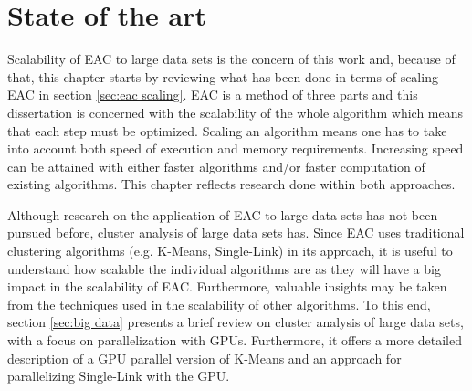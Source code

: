 
\chapter{State of the art}
\label{chapter:stateofart}




Scalability of EAC to large data sets is the concern of this work and, because of that, this chapter starts by reviewing what has been done in terms of scaling EAC in section \ref{sec:eac scaling}.
EAC is a method of three parts and this dissertation is concerned with the scalability of the whole algorithm which means that each step must be optimized.
Scaling an algorithm means one has to take into account both speed of execution and memory requirements.
Increasing speed can be attained with either faster algorithms and/or faster computation of existing algorithms.
This chapter reflects research done within both approaches.


Although research on the application of EAC to large data sets has not been pursued before, cluster analysis of large data sets has. 
Since EAC uses traditional clustering algorithms (e.g. K-Means, Single-Link) in its approach, it is useful to understand how scalable the individual algorithms are as they will have a big impact in the scalability of EAC.
Furthermore, valuable insights may be taken from the techniques used in the scalability of other algorithms.
To this end, section \ref{sec:big data} presents a brief review on cluster analysis of large data sets, with a focus on parallelization with GPUs.
Furthermore, it offers a more detailed description of a GPU parallel version of K-Means and an approach for parallelizing Single-Link with the GPU.

